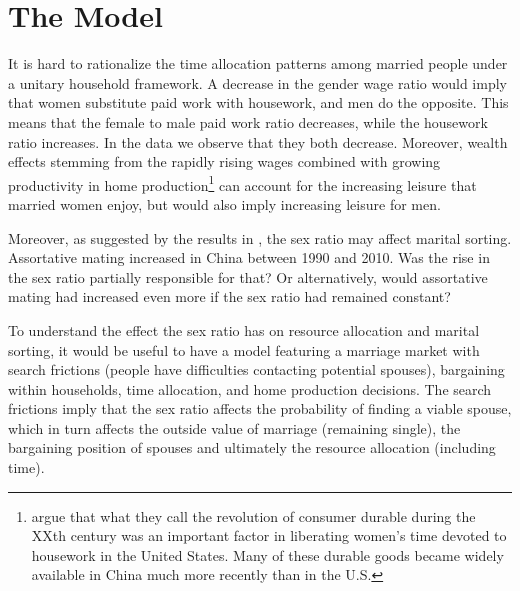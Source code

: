 \documentclass[12pt]{article}
\begin{document}
\section{The Model} \label{sec:model}

It is hard to rationalize the time allocation patterns among married people under a unitary household framework. A decrease in the gender wage ratio would imply that women substitute paid work with housework, and men do the opposite. This means that the female to male paid work ratio decreases, while the housework ratio increases. In the data we observe that they both decrease. Moreover, wealth effects stemming from the rapidly rising wages combined with growing productivity in home production\footnote{\cite{greenwoodetal05} argue that what they call the revolution of consumer durable during the XXth century was an important factor in liberating women's time devoted to housework in the United States. Many of these durable goods became widely available in China much more recently than in the U.S.} can account for the increasing leisure that married women enjoy, but would also imply increasing leisure for men.    

Moreover, as suggested by the results in \cite{abramitzkyetal11}, the sex ratio may affect marital sorting. Assortative mating increased in China between 1990 and 2010. Was the rise in the sex ratio partially responsible for that? Or alternatively, would assortative mating had increased even more if the sex ratio had remained constant? 

To understand the effect the sex ratio has on resource allocation and marital sorting, it would be useful to have a model featuring a marriage market with search frictions (people have difficulties contacting potential spouses), bargaining within households, time allocation, and home production decisions. The search frictions imply that the sex ratio affects the probability of finding a viable spouse, which in turn affects the outside value of marriage (remaining single), the bargaining position of spouses and ultimately the resource allocation (including time). 
\end{document}
